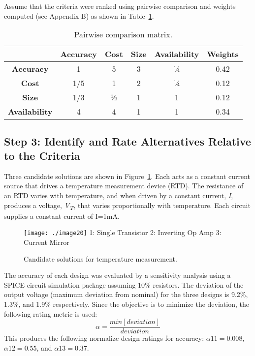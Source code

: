   Assume that the criteria were ranked using pairwise comparison and
  weights computed (see Appendix B) as shown in 
  Table~\ref{table:pairwiseCompMatrix}.

\begin{table}
\caption{Pairwise comparison matrix.}
\label{table:pairwiseCompMatrix}

\begin{tabular}{|c|c|c|c|c|c|}
\hline
  &
\textbf{Accuracy}&
\textbf{Cost}&
\textbf{Size}&
\textbf{Availability}& 
\textbf{Weights} \\ \hline

\textbf{Accuracy} & 1 & 5 & 3 & ¼ & 0.42 \\ \hline
\textbf{Cost} & 1/5 & 1 &  2  & ¼ & 0.12 \\ \hline
\textbf{Size} & 1/3 & ½ & 1 & 1 & 0.12 \\ \hline
\textbf{Availability} & 4 & 4 & 1  & 1 & 0.34 \\ \hline
\end{tabular}
\end{table}

\subsection*{Step 3: Identify and Rate Alternatives Relative to the Criteria}
\label{subsection:step-3-identify-and-rate-alternatives-relative-to-the-criteria}

Three candidate solutions are shown in 
Figure~\ref{figure:solutionsTemperature}. Each acts as a
constant current source that drives a temperature measurement device
(RTD). The resistance of an RTD varies with temperature, and when driven
by a constant cur­rent, \emph{I}, produces a voltage,
\emph{V\textsubscript{T}}, that varies proportionally with temperature.
Each circuit supplies a constant current of I=1mA.

\begin{figure}
\caption{Candidate solutions for temperature measurement.}
\texttt{[image: ./image20]}
1: Single Transistor 2: Inverting Op Amp 3: Current Mirror
\label{figure:solutionsTemperature}
\end{figure}

The accuracy of each design was evaluated by a sensitivity analysis
using a SPICE cir­cuit simulation package assuming 10\% resistors. The
deviation of the output volt­age (maximum deviation from nominal) for the
three designs is 9.2\%, 1.3\%, and 1.9\% respectively. Since the
objective is to minimize the deviation, the following rating metric is
used:
$$ \alpha = \frac{min[deviation]}{deviation}$$
This produces the following normalize design ratings for accuracy:
$\alpha{11} = 0.008$, 
$\alpha{12} = 0.55$, and 
$\alpha{13} = 0.37$.

